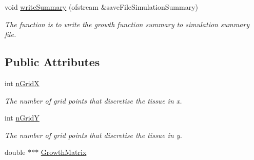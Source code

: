 \begin{DoxyCompactItemize}
\item 
void \hyperlink{classGridBasedGrowthFunction_a267f45c300d9ef98c6f4fa14a5181c78}{write\+Summary} (ofstream \&save\+File\+Simulation\+Summary)
\begin{DoxyCompactList}\small\item\em The function is to write the growth function summary to simulation summary file. \end{DoxyCompactList}\end{DoxyCompactItemize}
\subsection*{Public Attributes}
\begin{DoxyCompactItemize}
\item 
\hypertarget{classGridBasedGrowthFunction_af872b9963f3a579dcd615c23bcb58a86}{}int \hyperlink{classGridBasedGrowthFunction_af872b9963f3a579dcd615c23bcb58a86}{n\+Grid\+X}\label{classGridBasedGrowthFunction_af872b9963f3a579dcd615c23bcb58a86}

\begin{DoxyCompactList}\small\item\em The number of grid points that discretise the tissue in x. \end{DoxyCompactList}\item 
\hypertarget{classGridBasedGrowthFunction_a625bc963a1f1e7d1f1a35dbd0ef51728}{}int \hyperlink{classGridBasedGrowthFunction_a625bc963a1f1e7d1f1a35dbd0ef51728}{n\+Grid\+Y}\label{classGridBasedGrowthFunction_a625bc963a1f1e7d1f1a35dbd0ef51728}

\begin{DoxyCompactList}\small\item\em The number of grid points that discretise the tissue in y. \end{DoxyCompactList}\item 
\hypertarget{classGridBasedGrowthFunction_a5522d9b84fa95ebd65cdf290a4f0a65c}{}double $\ast$$\ast$$\ast$ \hyperlink{classGridBasedGrowthFunction_a5522d9b84fa95ebd65cdf290a4f0a65c}{Growth\+Matrix}\label{classGridBasedGrowthFunction_a5522d9b84fa95ebd65cdf290a4f0a65c}


\end{DoxyCompactItemize}
